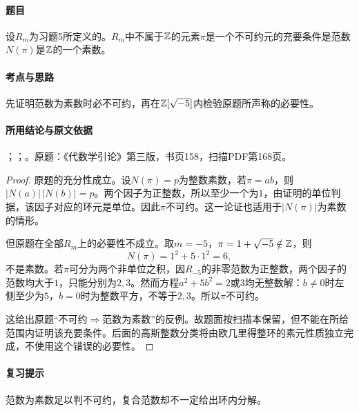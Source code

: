 \label{ex:4:15}

\paragraph{题目}

设$R_m$为习题5所定义的。$R_m$中不属于$\mathbb Z$的元素$\pi$是一个不可约元的充要条件是范数$N(\pi)$是$\mathbb Z$的一个素数。

\paragraph{考点与思路}

先证明范数为素数时必不可约，再在$\mathbb Z[\sqrt{-5}]$内检验原题所声称的必要性。

\paragraph{所用结论与原文依据}

；；。原题：《代数学引论》第三版，书页158，扫描PDF第168页。


\begin{proof}

原题的充分性成立。设$N(\pi)=p$为整数素数，若$\pi=ab$，则$|N(a)|\,|N(b)|=p$。两个因子为正整数，所以至少一个为$1$，由证明的单位判据，该因子对应的环元是单位。因此$\pi$不可约。这一论证也适用于$|N(\pi)|$为素数的情形。

但原题在全部$R_m$上的必要性不成立。取$m=-5$，$\pi=1+\sqrt{-5}\notin\mathbb Z$，则
\[
N(\pi)=1^2+5\cdot1^2=6,
\]
不是素数。若$\pi$可分为两个非单位之积，因$R_{-5}$的非零范数为正整数，两个因子的范数均大于$1$，只能分别为$2,3$。然而方程$a^2+5b^2=2$或$3$均无整数解：$b\ne0$时左侧至少为$5$，$b=0$时为整数平方，不等于$2,3$。所以$\pi$不可约。

这给出原题“不可约$\Rightarrow$范数为素数”的反例。故题面按扫描本保留，但不能在所给范围内证明该充要条件。后面的高斯整数分类将由欧几里得整环的素元性质独立完成，不使用这个错误的必要性。

\end{proof}

\paragraph{复习提示}

范数为素数足以判不可约，复合范数却不一定给出环内分解。

